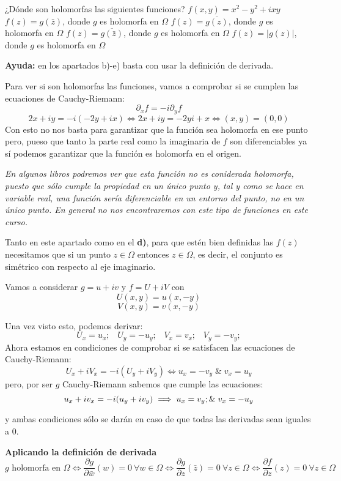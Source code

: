 \begin{problem}[7]
¿Dónde son holomorfas las siguientes funciones?
\ppart $f(x,y)=x^2-y^2+ixy$
\ppart $f(z)=g(\bar{z})$, donde $g$ es holomorfa en $\Omega$
\ppart $f(z)=\overline{g(z)}$, donde $g$ es holomorfa en $\Omega$
\ppart $f(z)=\overline{g(\bar{z})}$, donde $g$ es holomorfa en $\Omega$
\ppart $f(z)=|g(z)|$, donde $g$ es holomorfa en $\Omega$

\textbf{Ayuda:} en los apartados b)-e) basta con usar la definición de derivada.

\solution

Para ver si son holomorfas las funciones, vamos a comprobar si se cumplen las ecuaciones de Cauchy-Riemann:
\[\partial_x f = -i \partial_y f\]
\spart
\[2x+iy=-i\left( -2y +ix\right) \iff 2x+iy = -2yi+x \iff (x,y)=(0,0)\]
Con esto no nos basta para garantizar que la función sea holomorfa en ese punto pero, pueso que tanto la parte real como la imaginaria de $f$ son diferenciables ya sí podemos garantizar que la función es holomorfa en el origen.

\textit{En algunos libros podremos ver que esta función no es coniderada holomorfa, puesto que sólo cumple la propiedad en un único punto y, tal y como se hace en variable real, una función sería diferenciable en un entorno del punto, no en un único punto. En general no nos encontraremos con este tipo de funciones en este curso.}

\spart
Tanto en este apartado como en el \textbf{d)}, para que estén bien definidas las $f(z)$ necesitamos que si un punto $z\in Ω$ entonces $z \in Ω$, es decir, el conjunto es simétrico con respecto al eje imaginario.

Vamos a considerar $g=u+iv$ y $f=U+iV$ con
\[U(x,y)=u(x,-y)\]
\[V(x,y)=v(x,-y)\]

Una vez visto esto, podemos derivar:
\[U_x = u_x; \;\;\; U_y=-u_y; \;\;\; V_x=v_x; \; \; \; V_y=-v_y;\]
Ahora estamos en condiciones de comprobar si se satisfacen las ecuaciones de Cauchy-Riemann:
\[U_x+iV_x=-i\left(U_y+iV_y\right) \iff u_x = -v_y\; \& \; v_x=u_y\]
pero, por ser $g$ Cauchy-Riemann sabemos que cumple las ecuaciones:
\[u_x+iv_x=-i(u_y+iv_y) \implies u_x=v_y\\; \& \; v_x=-u_y\]

y ambas condiciones sólo se darán en caso de que todas las derivadas sean iguales a 0.

\textbf{Aplicando la definición de derivada}
\[g \text{ holomorfa en }Ω \iff \frac{\partial g}{\partial \bar{w}}(w)=0\ \forall w \in Ω \iff \frac{\partial g}{\partial z}(\bar{z})=0 \ \forall z \in Ω \iff \frac{\partial f}{\partial z}(z)=0 \ \forall z \in Ω\]


\end{problem}
